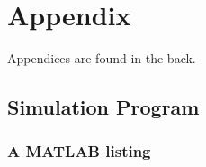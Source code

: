 \chapter{Appendix}

Appendices are found in the back. 

\section{Simulation Program}

\subsection{A MATLAB listing}

\lstset{language=matlab}


